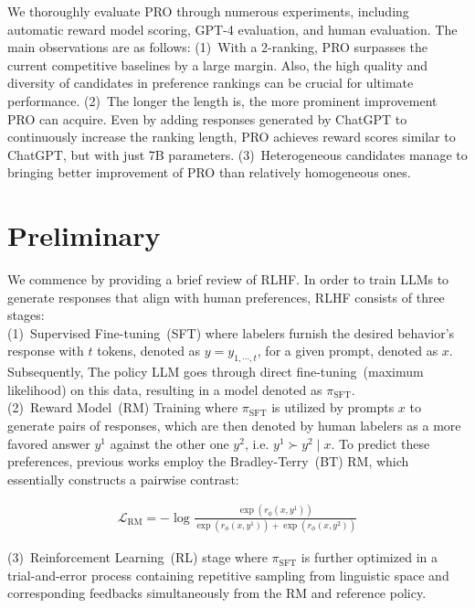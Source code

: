 We thoroughly evaluate PRO through numerous experiments, including automatic reward model scoring, GPT-4 evaluation, and human evaluation. The main observations are as follows: (1)~With a 2-ranking, PRO surpasses the current competitive baselines by a large margin. Also, the high quality and diversity of candidates in preference rankings can be crucial for ultimate performance. (2)~The longer the length is, the more prominent improvement PRO can acquire. Even by adding responses generated by ChatGPT to continuously increase the ranking length, PRO achieves reward scores similar to ChatGPT, but with just 7B parameters. (3)~Heterogeneous candidates manage to bringing better improvement of PRO than relatively homogeneous ones.

\section{Preliminary}
We commence by providing a brief review of RLHF. In order to train LLMs to generate responses that align with human preferences, RLHF consists of three stages:\\
(1)~Supervised Fine-tuning~(SFT) where labelers furnish the desired behavior's response with $t$ tokens, denoted as $y=y_{1,\cdots,t}$, for a given prompt, denoted as $x$. Subsequently, The policy LLM goes through direct fine-tuning~(maximum likelihood) on this data, resulting in a model denoted as $\pi_{\text{SFT}}$.\\
(2)~Reward Model~(RM) Training where $\pi_{\text{SFT}}$ is utilized by prompts $x$ to generate pairs of responses, which are then denoted by human labelers as a more favored answer $y^1$ against the other one $y^2$, i.e. $y^1\succ y^2 \mid x$. To predict these preferences, previous works employ the Bradley-Terry~(BT) RM, which essentially constructs a pairwise contrast:

\begin{equation}
\begin{aligned}
\label{eq:rm}
\mathcal{L}_{\text{RM}} = -\log \frac{\exp\left(r_{\phi}(x, y^1)\right)}{\exp\left(r_{\phi}(x, y^1)\right) + \exp\left(r_{\phi}(x, y^2)\right)}
\end{aligned}
\end{equation}

(3)~Reinforcement Learning~(RL) stage where $\pi_{\text{SFT}}$ is further optimized in a trial-and-error process containing repetitive sampling from linguistic space and corresponding feedbacks simultaneously from the RM and reference policy.

